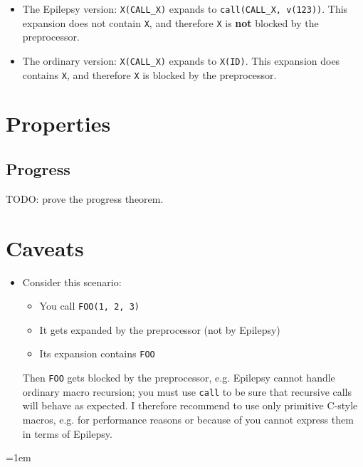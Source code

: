 \documentclass[12pt]{article}
\theoremstyle{break}
\begin{document}
\begin{itemize}
    \item The Epilepsy version: \texttt{X(CALL\_X)} expands to \texttt{call(CALL\_X, v(123))}.
    This expansion does not contain \texttt{X}, and therefore \texttt{X} is \textbf{not}
    blocked by the preprocessor.

    \item The ordinary version: \texttt{X(CALL\_X)} expands to \texttt{X(ID)}. This expansion
    does contains \texttt{X}, and therefore \texttt{X} is blocked by the preprocessor.
\end{itemize}

\section{Properties}

\subsection{Progress}

TODO: prove the progress theorem.

\section{Caveats}

\begin{itemize}
\item Consider this scenario:
    \begin{itemize}
        \item You call \texttt{FOO(1, 2, 3)}
        \item It gets expanded by the preprocessor (not by Epilepsy)
        \item Its expansion contains \texttt{FOO}
    \end{itemize}
Then \texttt{FOO} gets blocked \cite{Blueprinting} by the preprocessor, e.g. Epilepsy cannot handle ordinary
macro recursion; you must use \texttt{call} to be sure that recursive calls
will behave as expected. I therefore recommend to use only primitive C-style macros, e.g.
for performance reasons or because of you cannot express them in terms of Epilepsy.
\end{itemize}

\emergencystretch=1em
\printbibliography
\end{document}
